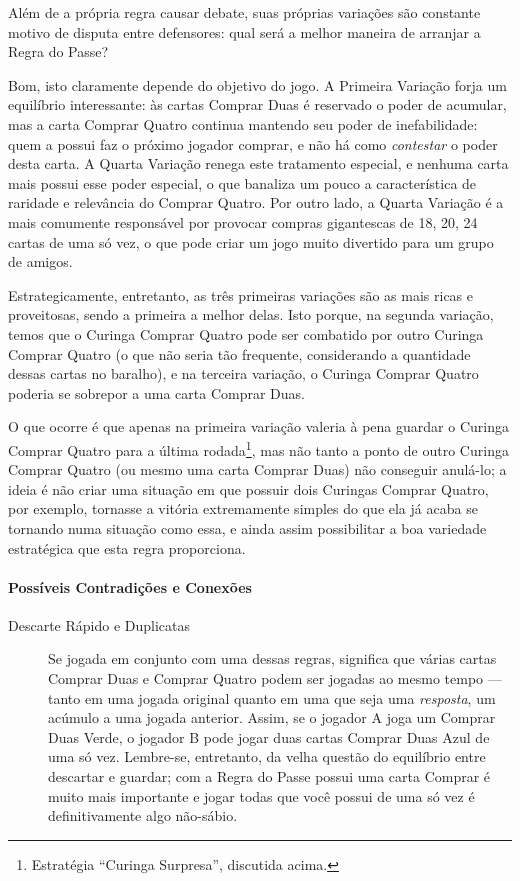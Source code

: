 Além de a própria regra causar debate, suas próprias variações são constante motivo de disputa entre defensores: qual será a melhor maneira de arranjar a Regra do Passe?

Bom, isto claramente depende do objetivo do jogo. A Primeira Variação forja um equilíbrio interessante: às cartas Comprar Duas é reservado o poder de acumular, mas a carta Comprar Quatro continua mantendo seu poder de inefabilidade: quem a possui faz o próximo jogador comprar, e não há como \emph{contestar} o poder desta carta. A Quarta Variação renega este tratamento especial, e nenhuma carta mais possui esse poder especial, o que banaliza um pouco a característica de raridade e relevância do Comprar Quatro. Por outro lado, a Quarta Variação é a mais comumente responsável por provocar compras gigantescas de 18, 20, 24 cartas de uma só vez, o que pode criar um jogo muito divertido para um grupo de amigos.

Estrategicamente, entretanto, as três primeiras variações são as mais ricas e proveitosas, sendo a primeira a melhor delas. Isto porque, na segunda variação, temos que o Curinga Comprar Quatro pode ser combatido por outro Curinga Comprar Quatro (o que não seria tão frequente, considerando a quantidade dessas cartas no baralho), e na terceira variação, o Curinga Comprar Quatro poderia se sobrepor a uma carta Comprar Duas.

O que ocorre é que apenas na primeira variação valeria à pena guardar o Curinga Comprar Quatro para a última rodada\footnote{Estratégia ``Curinga Surpresa'', discutida acima.}, mas não tanto a ponto de outro Curinga Comprar Quatro (ou mesmo uma carta Comprar Duas) não conseguir anulá-lo; a ideia é não criar uma situação em que possuir dois Curingas Comprar Quatro, por exemplo, tornasse a vitória extremamente simples do que ela já acaba se tornando numa situação como essa, e ainda assim possibilitar a boa variedade estratégica que esta regra proporciona.

\paragraph{Possíveis Contradições e Conexões}

\begin{description}
\item[Descarte Rápido e Duplicatas]{Se jogada em conjunto com uma dessas regras, significa que várias cartas Comprar Duas e Comprar Quatro podem ser jogadas ao mesmo tempo --- tanto em uma jogada original quanto em uma que seja uma \emph{resposta}, um acúmulo a uma jogada anterior. Assim, se o jogador A joga um Comprar Duas Verde, o jogador B pode jogar duas cartas Comprar Duas Azul de uma só vez. Lembre-se, entretanto, da velha questão do equilíbrio entre descartar e guardar; com a Regra do Passe possui uma carta Comprar é muito mais importante e jogar todas que você possui de uma só vez é definitivamente algo não-sábio.}
\end{description}

